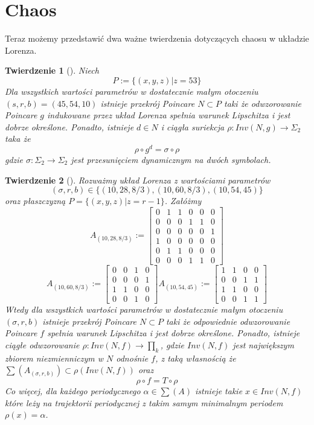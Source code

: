\documentclass[12pt]{report}
\newtheorem{theorem}{Twierdzenie}
\begin{document}
	\section{Chaos}
	Teraz możemy przedstawić dwa ważne twierdzenia dotyczących chaosu w układzie Lorenza.
	\begin{theorem}[\cite{MM}]
		Niech
			\[ P := \{(x, y, z) | z = 53\} \]
		Dla wszystkich wartości parametrów w dostatecznie małym otoczeniu $(s, r, b) = (45, 54, 10)$ istnieje przekrój Poincare $N \subset P$ taki że odwzorowanie Poincare $g$ indukowane przez układ Lorenza spełnia warunek Lipschitza i jest dobrze określone. Ponadto, istnieje $d \in N$ i ciągła suriekcja $\rho: Inv(N, g) \to \Sigma_2$ taka że
			\[ \rho \circ g^d = \sigma \circ \rho \]
		gdzie $\sigma : \Sigma_2 \to \Sigma_2$ jest przesunięciem dynamicznym na dwóch symbolach.
	\end{theorem}
	\begin{theorem}[\cite{MMS}]
		Rozważmy układ Lorenza z wartościami parametrów
			\[ (\sigma, r, b) \in \{(10, 28, 8/3), (10, 60, 8/3), (10, 54, 45)\} \]
		oraz płaszczyzną $P = \{(x, y, z) | z = r - 1\}$. Załóżmy
			\[ A_{(10,28,8/3)} := \begin{bmatrix}
									0 & 1 & 1 & 0 & 0 & 0 \\
									0 & 0 & 0 & 1 & 1 & 0 \\
									0 & 0 & 0 & 0 & 0 & 1 \\
									1 & 0 & 0 & 0 & 0 & 0 \\
									0 & 1 & 1 & 0 & 0 & 0 \\
									0 & 0 & 0 & 1 & 1 & 0
								\end{bmatrix}
			\]
			\[
			   A_{(10,60,8/3)} := \begin{bmatrix}
			   						0 & 0 & 1 & 0 \\
			   						0 & 0 & 0 & 1 \\
			   						1 & 1 & 0 & 0 \\
			   						0 & 0 & 1 & 0
			   					\end{bmatrix}
			   A_{(10,54,45)} := \begin{bmatrix}
			   						1 & 1 & 0 & 0 \\
			   						0 & 0 & 1 & 1 \\
			   						1 & 1 & 0 & 0 \\
			   						0 & 0 & 1 & 1
			   					\end{bmatrix}
			\]
		Wtedy dla wszystkich wartości parametrów w dostatecznie małym otoczeniu $(\sigma, r, b)$ istnieje przekrój Poincare $N \subset P$ taki że odpowiednie odwzorowanie Poincare $f$ spełnia warunek Lipschitza i jest dobrze określone. Ponadto, istnieje ciągłe odwzorowanie $\rho : Inv(N, f) \to \prod_k$, gdzie $Inv(N, f)$ jest największym zbiorem niezmienniczym w $N$ odnośnie $f$, z taką własnością że $\sum (A_{(\sigma, r, b)}) \subset \rho (Inv(N, f))$ oraz
			\[ \rho \circ f = T \circ \rho \]
		Co więcej, dla każdego periodycznego $\alpha \in \sum (A)$ istnieje takie $x \in Inv(N, f)$ które leży na trajektorii periodycznej z takim samym minimalnym periodem $\rho(x) = \alpha$.
	\end{theorem}
\end{document}
